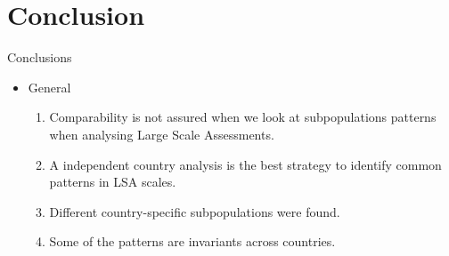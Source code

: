 \documentclass[11pt,t]{beamer}
\begin{document}
	

\section{Conclusion}
\begin{frame}{Conclusions}
\vspace{2mm} 
\begin{itemize}

\item General 
\vspace{2mm} 
\begin{enumerate}
\item Comparability is not assured when we look at subpopulations patterns when analysing Large Scale Assessments.
\vspace{3.1mm} 
\item A independent country analysis is the best strategy to identify common patterns in LSA scales. 
\vspace{3.1mm} 
\item Different country-specific subpopulations were found. 
\vspace{3.1mm} 
\item Some of the patterns are invariants across countries.
\vspace{3.1mm} 
\end{enumerate}
\end{itemize}
\end{frame}
\end{document}
